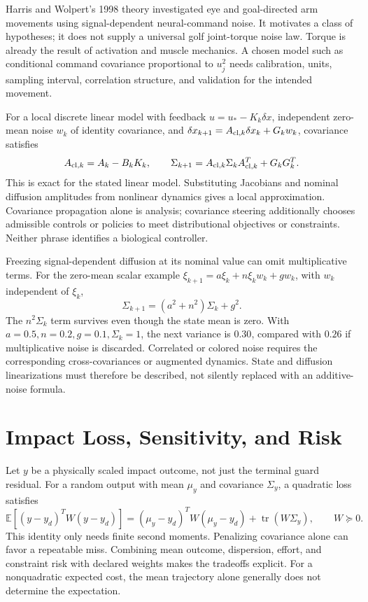\documentclass[12pt, openany]{book}
\theoremstyle{plain}
\begin{document}
Harris and Wolpert's 1998 theory investigated eye and goal-directed arm
movements using signal-dependent neural-command noise. It motivates a class
of hypotheses; it does not supply a universal golf joint-torque noise law.
Torque is already the result of activation and muscle mechanics. A chosen
model such as conditional command covariance proportional to $u_j^2$ needs
calibration, units, sampling interval, correlation structure, and validation
for the intended movement.

For a local discrete linear model with feedback
$u=u_*-K_k\delta x$, independent zero-mean noise $w_k$ of identity covariance,
and $\delta x_{k+1}=A_{{\rm cl},k}\delta x_k+G_kw_k$, covariance satisfies
\begin{equation}\label{eq:ocp_covariance}
 A_{{\rm cl},k}=A_k-B_kK_k,\qquad
 \Sigma_{k+1}=A_{{\rm cl},k}\Sigma_kA_{{\rm cl},k}^T+G_kG_k^T.
\end{equation}
This is exact for the stated linear model. Substituting Jacobians and nominal
diffusion amplitudes from nonlinear dynamics gives a local approximation.
Covariance propagation alone is analysis; covariance steering additionally
chooses admissible controls or policies to meet distributional objectives
or constraints. Neither phrase identifies a biological controller.

Freezing signal-dependent diffusion at its nominal value can omit
multiplicative terms. For the zero-mean scalar example
$\xi_{k+1}=a\xi_k+n\xi_kw_k+g w_k$, with $w_k$ independent of $\xi_k$,
\begin{equation}\label{eq:multiplicative_covariance}
 \Sigma_{k+1}=(a^2+n^2)\Sigma_k+g^2.
\end{equation}
The $n^2\Sigma_k$ term survives even though the state mean is zero. With
$a=0.5,n=0.2,g=0.1,\Sigma_k=1$, the next variance is $0.30$, compared with
$0.26$ if multiplicative noise is discarded. Correlated or colored noise
requires the corresponding cross-covariances or augmented dynamics. State
and diffusion linearizations must therefore be described, not silently
replaced with an additive-noise formula.

\section{Impact Loss, Sensitivity, and Risk}

Let $y$ be a physically scaled impact outcome, not just the terminal guard
residual. For a random output with mean $\mu_y$
and covariance $\Sigma_y$, a quadratic loss satisfies
\begin{equation}\label{eq:ocp_output_loss}
 \mathbb E[(y-y_d)^TW(y-y_d)]
 =(\mu_y-y_d)^TW(\mu_y-y_d)+\operatorname{tr}(W\Sigma_y),
 \qquad W\succeq0.
\end{equation}
This identity only needs finite second moments. Penalizing covariance alone
can favor a repeatable miss. Combining mean outcome, dispersion, effort, and
constraint risk with declared weights makes the tradeoffs explicit. For a
nonquadratic expected cost, the mean trajectory alone generally does not
determine the expectation.
\end{document}
